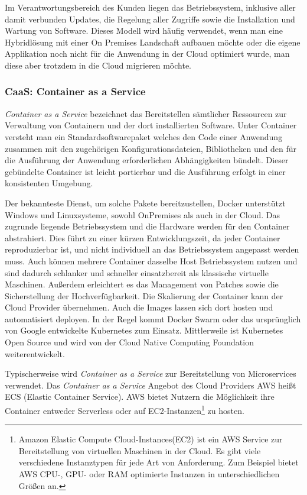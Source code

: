    Im Verantwortungsbereich des Kunden liegen das Betriebssystem, inklusive aller damit verbunden Updates, die Regelung aller Zugriffe sowie die Installation und Wartung von Software.
   Dieses Modell wird häufig verwendet, wenn man eine Hybridlösung mit einer On Premises Landschaft aufbauen möchte oder die eigene Applikation noch nicht für die Anwendung in der Cloud optimiert wurde, man diese aber trotzdem in die Cloud migrieren möchte.\cite{CloudComputingDef}

   \subsubsection{CaaS: Container as a Service}
   \textsl{Container as a Service} bezeichnet das Bereitstellen sämtlicher Ressourcen zur Verwaltung von Containern und der dort installierten Software.
   Unter Container versteht man ein {}\glqq Standardsoftwarepaket\grqq{} welches {}\glqq den Code einer Anwendung zusammen mit den zugehörigen Konfigurationsdateien,
   Bibliotheken und den für die Ausführung der Anwendung erforderlichen Abhängigkeiten\grqq{} bündelt. \cite{CaaS}
   Dieser gebündelte Container ist leicht portierbar und die Ausführung erfolgt in einer konsistenten Umgebung.

   Der bekannteste Dienst, um solche Pakete bereitzustellen, Docker unterstützt Windows und Linuxsysteme, sowohl OnPremises als auch in der Cloud.
   Das zugrunde liegende Betriebssystem und die Hardware werden für den Container abstrahiert.
   Dies führt zu einer kürzen Entwicklungszeit, da jeder Container reproduzierbar ist, und nicht individuell an das Betriebssystem angepasst werden muss.
   Auch können mehrere Container dasselbe Host Betriebssystem nutzen und sind dadurch schlanker und schneller einsatzbereit als klassische virtuelle Maschinen.
   Außerdem erleichtert es das Management von Patches sowie die Sicherstellung der Hochverfügbarkeit.
   Die Skalierung der Container kann der Cloud Provider übernehmen. Auch die Images lassen sich dort hosten und automatisiert deployen.
   In der Regel kommt Docker Swarm oder das ursprünglich von Google entwickelte Kubernetes zum Einsatz.
   Mittlerweile ist Kubernetes Open Source und wird von der Cloud Native Computing Foundation weiterentwickelt.

   Typischerweise wird \textsl{Container as a Service} zur Bereitstellung von Microservices verwendet.
   Das \textsl{Container as a Service} Angebot des Cloud Providers AWS heißt ECS (Elastic Container Service).
   AWS bietet Nutzern die Möglichkeit ihre Container entweder Serverless oder auf EC2-Instanzen\footnote{Amazon Elastic Compute Cloud-Instances(EC2) ist ein AWS Service
   zur Bereitstellung von virtuellen Maschinen in der Cloud. Es gibt viele verschiedene Instanztypen für jede Art von Anforderung.
   Zum Beispiel bietet AWS CPU-, GPU- oder RAM optimierte Instanzen in unterschiedlichen Größen an. } zu hosten. \cite{AWSECS}

